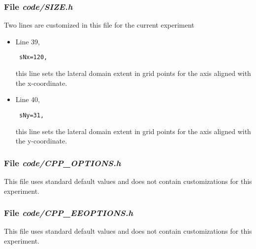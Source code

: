 \subsubsection{File {\it code/SIZE.h}}
\label{www:tutorials}

Two lines are customized in this file for the current experiment

\begin{itemize}

\item Line 39, 
\begin{verbatim} sNx=120, \end{verbatim} this line sets
the lateral domain extent in grid points for the
axis aligned with the x-coordinate.

\item Line 40, 
\begin{verbatim} sNy=31, \end{verbatim} this line sets
the lateral domain extent in grid points for the
axis aligned with the y-coordinate.

\end{itemize}

\begin{small}

\end{small}

\subsubsection{File {\it code/CPP\_OPTIONS.h}}
\label{www:tutorials}

This file uses standard default values and does not contain
customizations for this experiment.


\subsubsection{File {\it code/CPP\_EEOPTIONS.h}}
\label{www:tutorials}

This file uses standard default values and does not contain
customizations for this experiment.

